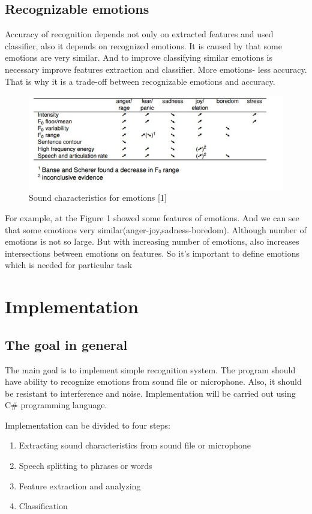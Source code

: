 \documentclass[12pt, letterpaper]{article}
\begin{document}
\subsection{Recognizable emotions}
Accuracy of recognition depends not only on extracted features and used classifier, also it depends on recognized emotions. It is caused by that some emotions are very similar. And to improve classifying similar emotions is necessary improve features extraction and classifier. More emotions- less accuracy. That is why it is a trade-off between recognizable emotions and accuracy.
\begin{figure}[t]
	\centering
		\includegraphics[scale=0.8]{emotion-table-example}
	\caption{Sound characteristics for emotions [1]}
	\label{fig:emotion-table-example}
\end{figure}

For example, at the Figure 1 showed some features of emotions. And we can see that some emotions very similar(anger-joy,sadness-boredom). Although number of emotions is not so large. But with increasing number of emotions, also increases intersections between emotions on features. So it's important to define emotions which is needed for particular task

\section{Implementation}
\subsection{The goal in general}
The main goal is to implement simple recognition system. The program should have ability to recognize emotions from sound file or microphone. Also, it should be resistant to interference and noise. Implementation will be carried out using C\# programming language.

Implementation can be divided to four steps:
\begin{enumerate}
	\item Extracting sound characteristics from sound file or microphone
	\item Speech splitting to phrases or words
	\item Feature extraction and analyzing
	\item Classification
\end{enumerate}
\end{document}

